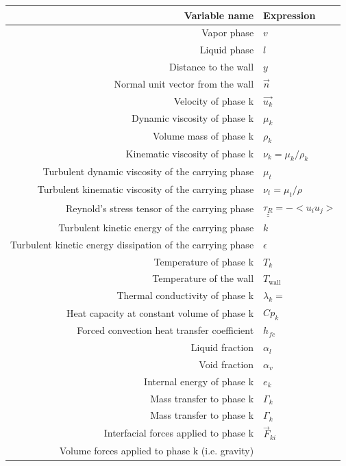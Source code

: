 \begin{center}
\begin{tabular}{|r|l|}
	\hline Variable name & Expression \\ \hline \hline
	Vapor phase & $v$ \\ \hline
	Liquid phase & $l$ \\ \hline
	Distance to the wall & $y$ \\ \hline
	Normal unit vector from the wall & $\overrightarrow{n}$ \\ \hline
	Velocity of phase k & $\overrightarrow{u_k}$\\ \hline
	Dynamic viscosity of phase k
		& $\mu_k $ \\ \hline
	Volume mass of phase k
		& $\rho_k$ \\ \hline
	Kinematic viscosity of phase k
		& $\nu_k = \mu_k/\rho_k$ \\ \hline
	Turbulent dynamic viscosity of the carrying phase
		& $\mu_{t} $ \\ \hline
	Turbulent kinematic viscosity of the carrying phase
		& $\nu_t = \mu_t/\rho$ \\ \hline
	Reynold's stress tensor of the carrying phase
		& $\underline{\underline{\tau_R}} = - <u_iu_j>$ \\ \hline
	Turbulent kinetic energy of the carrying phase
		& $k$ \\ \hline
	Turbulent kinetic energy dissipation of the carrying phase
		& $\epsilon$ \\ \hline	
	Temperature of phase k
		& $T_{k}$ \\ \hline
	Temperature of the wall
		& $T_\text{wall}$ \\ \hline
	Thermal conductivity of phase k
		& $\lambda_k =$ \\ \hline
	Heat capacity at constant volume of phase k
		& $Cp_k$ \\ \hline
	Forced convection heat transfer coefficient
		& $h_{fc}$	\\ \hline
	Liquid fraction 
		& $\alpha_l $ \\ \hline
	Void fraction 
		& $\alpha_v $ \\ \hline
	Internal energy of phase k
		& $e_k $ \\ \hline
	Mass transfer to phase k
		& $\Gamma_k $ \\ \hline
	Mass transfer to phase k
		& $\Gamma_k $ \\ \hline
	Interfacial forces applied to phase k
		& $\vec{F}_{ki}$  \\ \hline
	Volume forces applied to phase k (i.e. gravity)

\end{tabular}
\end{center}
